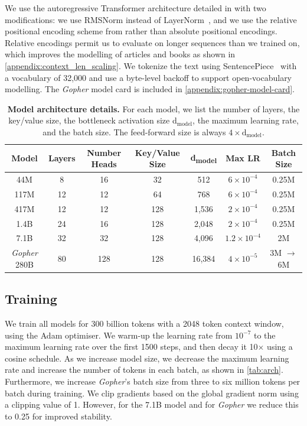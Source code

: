 \documentclass[11pt, a4paper, logo, internal, copyright, nonumbering]{deepmind}
\newcommand{\gopher}{\textit{Gopher}\xspace}
\begin{document}
We use the autoregressive Transformer architecture detailed in \citet{radford2019language} with two modifications: we use RMSNorm \citep{zhang2019root} instead of LayerNorm~\citep{ba2016layer}, 
and we use the relative positional encoding scheme from \citet{dai2019transformer} rather than absolute positional encodings.
Relative encodings permit us to evaluate on longer sequences than we trained on, which improves the modelling of articles and books as shown in \autoref{appendix:context_len_scaling}.
We tokenize the text using SentencePiece~\citep{kudo2018sentencepiece} with a vocabulary of 32,000 and use a byte-level backoff to support open-vocabulary modelling. 
The \gopher model card \citep{mitchell2019model} is included in \autoref{appendix:gopher-model-card}.

\begin{table}[t]
    \centering
    \begin{tabular}{ccccccc}
    \toprule
        \textbf{Model} & \textbf{Layers} & \textbf{Number Heads} & \textbf{Key/Value Size} & \textbf{d\textsubscript{model}} & \textbf{Max LR}  & \textbf{Batch Size} \\ 
        \midrule
         44M & 8 & 16 & 32 & 512 & $6 \times 10^{-4}$  &  0.25M \\
         117M & 12 &  12 & 64 & 768 & $6 \times 10^{-4}$ &  0.25M \\
         417M & 12 & 12 & 128 & 1,536 & $2 \times 10^{-4}$ &  0.25M \\ 
         1.4B & 24 & 16 & 128 & 2,048 & $2 \times 10^{-4}$ & 0.25M \\
         7.1B & 32 & 32 & 128 & 4,096 & $1.2 \times 10^{-4}$ & 2M \\
         \gopher 280B & 80 & 128 & 128 & 16,384 & $4 \times 10^{-5}$ & 3M $\rightarrow$ 6M\\ 
         \bottomrule
    \end{tabular}
    \caption{\textbf{Model architecture details.} For each model, we list the number of layers, the key/value size, the bottleneck activation size d$_{\text{model}}$, the maximum learning rate, and the batch size. The feed-forward size is always $4\times \textrm{d}_{\textrm{model}}$.}
    \label{tab:arch}
\end{table}

\subsection{Training}
\label{method:training}
We train all models for 300 billion tokens with a 2048 token context window, using the Adam \citep{kingma2014adam} optimiser.
We warm-up the learning rate from $10^{-7}$ to the maximum learning rate over the first 1500 steps, and then decay it 10$\times$ using a cosine schedule.
As we increase model size, we decrease the maximum learning rate and increase the number of tokens in each batch, as shown in \autoref{tab:arch}.
Furthermore, we increase \gopher's batch size from three to six million tokens per batch during training.
We clip gradients based on the global gradient norm using a clipping value of 1.
However, for the 7.1B model and for \gopher we reduce this to 0.25 for improved stability.
\end{document}

